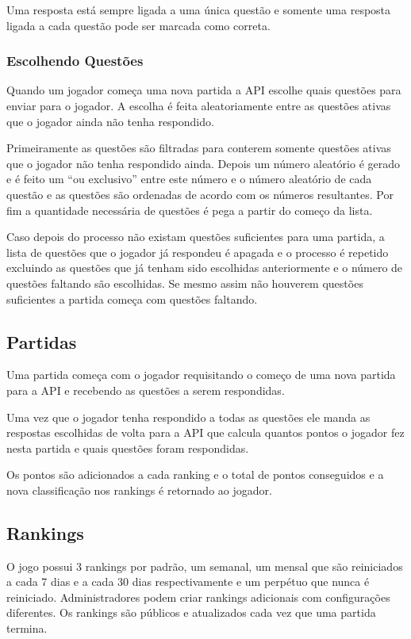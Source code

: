 Uma resposta está sempre ligada a uma única questão e somente uma resposta ligada a cada questão pode ser marcada como correta. 


\subsubsection{Escolhendo Questões}
\label{subsubsec:escolhendo}

Quando um jogador começa uma nova partida a API escolhe quais questões para enviar para o jogador. A escolha é feita aleatoriamente entre as questões ativas que o jogador ainda não tenha respondido. 

Primeiramente as questões são filtradas para conterem somente questões ativas que o jogador não tenha respondido ainda. Depois um número aleatório é gerado e é feito um “ou exclusivo” entre este número e o número aleatório de cada questão e as questões são ordenadas de acordo com os números resultantes. Por fim a quantidade necessária de questões é pega a partir do começo da lista.

Caso depois do processo não existam questões suficientes para uma partida, a lista de questões que o jogador já respondeu é apagada e o processo é repetido excluindo as questões que já tenham sido escolhidas anteriormente e o número de questões faltando são escolhidas. Se mesmo assim não houverem questões suficientes a partida começa com questões faltando.

\subsection{Partidas}
\label{subsec:partidas}

Uma partida começa com o jogador requisitando o começo de uma nova partida para a API e recebendo as questões a serem respondidas. 

Uma vez que o jogador tenha respondido a todas as questões ele manda as respostas escolhidas de volta para a API que calcula quantos pontos o jogador fez nesta partida e quais questões foram respondidas.

Os pontos são adicionados a cada ranking e o total de pontos conseguidos e a nova classificação nos rankings é retornado ao jogador.

\subsection{Rankings}
\label{subsec:rankings}

O jogo possui 3 rankings por padrão, um semanal, um mensal que são reiniciados a cada 7 dias e a cada 30 dias respectivamente e um perpétuo que nunca é reiniciado.     Administradores podem criar rankings adicionais com configurações diferentes. Os rankings são públicos e atualizados cada vez que uma partida termina.

